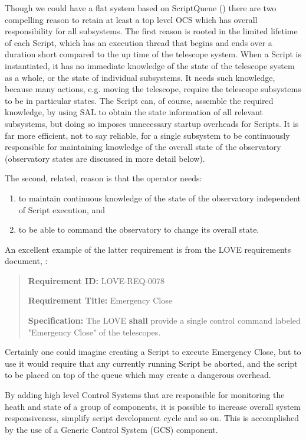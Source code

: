 Though we could have a flat system based on ScriptQueue () there are two compelling reason to retain at least a top level OCS which has overall responsibility for all subsystems. The first reason is rooted in the limited lifetime of each Script, which has an execution thread that begins and ends over a duration short compared to the up time of the telescope system. When a Script is instantiated, it has no immediate knowledge of the state of the telescope system as a whole, or the state of individual subsystems. It needs such knowledge, because many actions, e.g. moving the telescope, require the telescope subsystems to be in particular states. The Script can, of course, assemble the required knowledge, by using SAL to obtain the state information of all relevant subsystems, but doing so imposes unnecessary startup overheads for Scripts. It is far more efficient, not to say reliable, for a single subsystem to be continuously responsible for maintaining knowledge of the overall state of the observatory (observatory states are discussed in more detail below).

The second, related, reason is that the operator needs:
\begin{enumerate}
\item to maintain continuous knowledge of the state of the observatory independent of Script execution, and
\item  to be able to command the observatory to change its overall state.
\end{enumerate}
An excellent example of the latter requirement is from the LOVE requirements document, :

\begin{quotation}
{\bf Requirement ID:} LOVE-REQ-0078

{\bf Requirement Title:} Emergency Close

{\bf Specification:} The LOVE {\bf shall} provide a single control command labeled "Emergency Close" of the telescopes.
\end{quotation}

Certainly one could imagine creating a Script to execute Emergency Close, but to use it would require that any currently running Script be aborted, and the script to be placed on top of the queue which may create a dangerous overhead.

By adding high level Control Systems that are responsible for monitoring the heath and state of a group of components, it is possible to increase overall system responsiveness, simplify script development cycle and so on. This is accomplished by the use of a Generic Control System (GCS) component.


